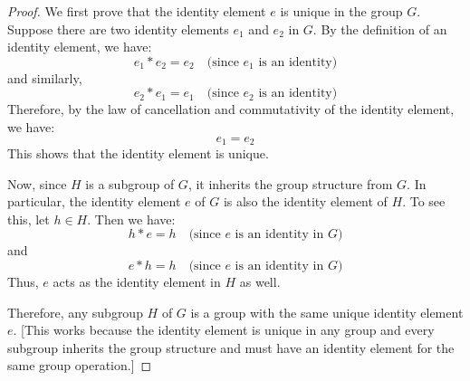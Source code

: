 \documentclass[openany]{book}
\begin{document}
\begin{proof}
    We first prove that the identity element $e$ is unique in the group $G$. Suppose there are two identity elements $e_1$ and $e_2$ in $G$. By the definition of an identity element, we have:
    $$ e_1 * e_2 = e_2 \quad \text{(since $e_1$ is an identity)} $$
    and similarly,
    $$ e_2 * e_1 = e_1 \quad \text{(since $e_2$ is an identity)} $$
    Therefore, by the law of cancellation and commutativity of the identity element, we have:
    $$ e_1 = e_2 $$
    This shows that the identity element is unique.

    Now, since $H$ is a subgroup of $G$, it inherits the group structure from $G$. In particular, the identity element $e$ of $G$ is also the identity element of $H$. To see this, let $h \in H$. Then we have:
    $$ h * e = h \quad \text{(since $e$ is an identity in $G$)} $$
    and
    $$ e * h = h \quad \text{(since $e$ is an identity in $G$)} $$
    Thus, $e$ acts as the identity element in $H$ as well.

    Therefore, any subgroup $H$ of $G$ is a group with the same unique identity element $e$. [This works because the identity element is unique in any group and every subgroup inherits the group structure and must have an identity element for the same group operation.]
\end{proof}
\end{document}
